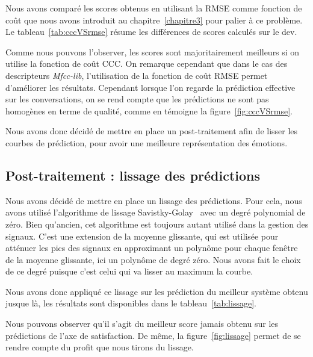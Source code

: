 

Nous avons comparé les scores obtenus en utilisant la RMSE comme fonction de coût que nous avons introduit au chapitre~\ref{chapitre3} pour palier à ce problème. Le tableau~\ref{tab:cccVSrmse} résume les différences de scores calculés sur le dev.

Comme nous pouvons l'observer, les scores sont majoritairement meilleurs si on utilise la fonction de coût CCC. On remarque cependant que dans le cas des descripteurs \textit{Mfcc-lib}, l'utilisation de la fonction de coût RMSE permet d'améliorer les résultats. Cependant lorsque l'on regarde la prédiction effective sur les conversations, on se rend compte que les prédictions ne sont pas homogènes en terme de qualité, comme en témoigne la figure~\ref{fig:cccVSrmse}.



Nous avons donc décidé de mettre en place un post-traitement afin de lisser les courbes de prédiction, pour avoir une meilleure représentation des émotions.

\subsection{Post-traitement : lissage des prédictions}
Nous avons décidé de mettre en place un lissage des prédictions. Pour cela, nous avons utilisé l'algorithme de lissage Savistky-Golay~\cite{Savitzky1964} avec un degré polynomial de zéro. Bien qu'ancien, cet algorithme est toujours autant utilisé dans la gestion des signaux. C'est une extension de la moyenne glissante, qui est utilisée pour atténuer les pics des signaux en approximant un polynôme pour chaque fenêtre de la moyenne glissante, ici un polynôme de degré zéro. Nous avons fait le choix de ce degré puisque c'est celui qui va lisser au maximum la courbe.

Nous avons donc appliqué ce lissage sur les prédiction du meilleur système obtenu jusque là, les résultats sont disponibles dans le tableau~\ref{tab:lissage}.



Nous pouvons observer qu'il s'agit du meilleur score jamais obtenu sur les prédictions de l'axe de satisfaction. De même, la figure~\ref{fig:lissage} permet de se rendre compte du profit que nous tirons du lissage.

